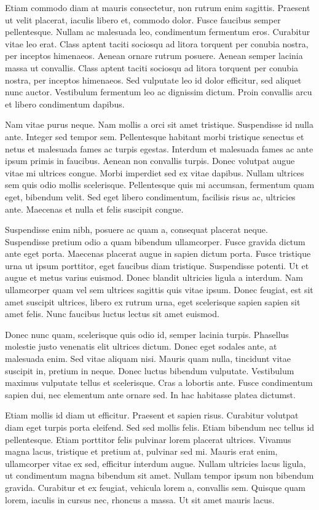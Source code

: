 Etiam commodo diam at mauris consectetur, non rutrum enim sagittis. Praesent ut velit placerat, iaculis libero et, commodo dolor. Fusce faucibus semper pellentesque. Nullam ac malesuada leo, condimentum fermentum eros. Curabitur vitae leo erat. Class aptent taciti sociosqu ad litora torquent per conubia nostra, per inceptos himenaeos. Aenean ornare rutrum posuere. Aenean semper lacinia massa ut convallis. Class aptent taciti sociosqu ad litora torquent per conubia nostra, per inceptos himenaeos. Sed vulputate leo id dolor efficitur, sed aliquet nunc auctor. Vestibulum fermentum leo ac dignissim dictum. Proin convallis arcu et libero condimentum dapibus.

Nam vitae purus neque. Nam mollis a orci sit amet tristique. Suspendisse id nulla ante. Integer sed tempor sem. Pellentesque habitant morbi tristique senectus et netus et malesuada fames ac turpis egestas. Interdum et malesuada fames ac ante ipsum primis in faucibus. Aenean non convallis turpis. Donec volutpat augue vitae mi ultrices congue. Morbi imperdiet sed ex vitae dapibus. Nullam ultrices sem quis odio mollis scelerisque. Pellentesque quis mi accumsan, fermentum quam eget, bibendum velit. Sed eget libero condimentum, facilisis risus ac, ultricies ante. Maecenas et nulla et felis suscipit congue.

Suspendisse enim nibh, posuere ac quam a, consequat placerat neque. Suspendisse pretium odio a quam bibendum ullamcorper. Fusce gravida dictum ante eget porta. Maecenas placerat augue in sapien dictum porta. Fusce tristique urna ut ipsum porttitor, eget faucibus diam tristique. Suspendisse potenti. Ut et augue et metus varius euismod. Donec blandit ultricies ligula a interdum. Nam ullamcorper quam vel sem ultrices sagittis quis vitae ipsum. Donec feugiat, est sit amet suscipit ultrices, libero ex rutrum urna, eget scelerisque sapien sapien sit amet felis. Nunc faucibus luctus lectus sit amet euismod.

Donec nunc quam, scelerisque quis odio id, semper lacinia turpis. Phasellus molestie justo venenatis elit ultrices dictum. Donec eget sodales ante, at malesuada enim. Sed vitae aliquam nisi. Mauris quam nulla, tincidunt vitae suscipit in, pretium in neque. Donec luctus bibendum vulputate. Vestibulum maximus vulputate tellus et scelerisque. Cras a lobortis ante. Fusce condimentum sapien dui, nec elementum ante ornare sed. In hac habitasse platea dictumst.

Etiam mollis id diam ut efficitur. Praesent et sapien risus. Curabitur volutpat diam eget turpis porta eleifend. Sed sed mollis felis. Etiam bibendum nec tellus id pellentesque. Etiam porttitor felis pulvinar lorem placerat ultrices. Vivamus magna lacus, tristique et pretium at, pulvinar sed mi. Mauris erat enim, ullamcorper vitae ex sed, efficitur interdum augue. Nullam ultricies lacus ligula, ut condimentum magna bibendum sit amet. Nullam tempor ipsum non bibendum gravida. Curabitur et ex feugiat, vehicula lorem a, convallis sem. Quisque quam lorem, iaculis in cursus nec, rhoncus a massa. Ut sit amet mauris lacus.

